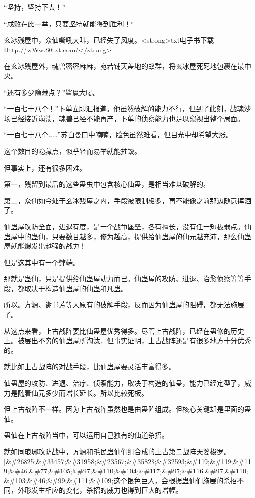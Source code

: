
\begin{this_body}

“坚持，坚持下去！”

“成败在此一举，只要坚持就能得到胜利！”

玄冰残屋中，众仙嘶吼大叫，已经失了风度。<strong>txt电子书下载Http://wWw.80txt.com/</strong>

在玄冰残屋外，魂兽密密麻麻，宛若铺天盖地的蚁群，将玄冰屋死死地包裹在最中央。

“还有多少隐藏点？”鲨魔大喝。

“一百七十八个！”卜单立即汇报道。他虽然破解的能力不行，但到了此刻，战魂沙场已经接近崩溃，魂兽已经不能再产，卜单的侦察能力也足以窥视出整个局面。

“一百七十八个……”苏白曼口中喃喃，脸色虽然难看，但目光中却希望大涨。

这个数目的隐藏点，似乎轻而易举就能摧毁。

但事实上，还有很多困难。

第一，残留到最后的这些蛊虫中包含核心仙蛊，是相当难以破解的。

第二，众仙如今处于玄冰残屋之内，手段被限制极多，再不能像之前那边随意挥洒了。

仙蛊屋攻防全面，进退有度，是一个战争堡垒，各有擅长，没有任一短板弱点。仙蛊屋中的蛊仙，只要数目越多，修为越高，提供给仙蛊屋的仙元越充沛，那么仙蛊屋就能爆发出越强的战力！

但是这其中有一个弊端。

那就是蛊仙，只是提供给仙蛊屋动力而已。仙蛊屋的攻防、进退、治愈侦察等等手段，都取决于构造仙蛊屋的仙蛊和凡蛊。

所以。方源、谢书芳等人原有的破解手段，反而因为仙蛊屋的阻碍，都无法施展了。

从这点来看，上古战阵要比仙蛊屋优秀得多。尽管上古战阵，已经在蛊修的历史上。被层出不穷的仙蛊屋所淘汰，但事实证明，上古战阵还是有很多地方十分优秀的。

就比如上古战阵的对战手段，比仙蛊屋要灵活丰富得多。

仙蛊屋的攻防、进退、治疗、侦察能力，取决于构造的仙蛊，能力已经定型了，威力是随着仙元多少而增长延长。所以比较死板。

但上古战阵不一样。因为上古战阵虽然也是由蛊阵组成。但核心关键却是里面的蛊仙。

蛊仙在上古战阵当中，可以运用自己独有的仙道杀招。

就如同琅琊攻防战中，方源和毛民蛊仙们组合成的上古第二战阵天婆梭罗。[\&\#26825;\&\#33457;\&\#31958;\&\#23567;\&\#35828;\&\#32593;\&\#119;\&\#119;\&\#119;\&\#46;\&\#77;\&\#105;\&\#97;\&\#110;\&\#104;\&\#117;\&\#97;\&\#116;\&\#97;\&\#110;\&\#103;\&\#46;\&\#99;\&\#111;\&\#109;这个银色巨人，会根据蛊仙们施展的杀招不同，外形发生相应的变化，杀招的威力也得到巨大的增幅。


\end{this_body}

